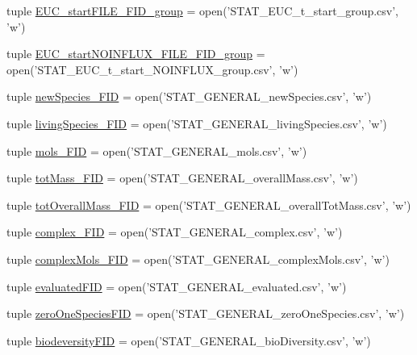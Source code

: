 \begin{DoxyCompactItemize}
\item 
tuple \hyperlink{a00099_abe1a2acadc97e46d55c6f4164c0890dc}{E\-U\-C\-\_\-start\-F\-I\-L\-E\-\_\-\-F\-I\-D\-\_\-group} = open('S\-T\-A\-T\-\_\-\-E\-U\-C\-\_\-t\-\_\-start\-\_\-group.\-csv', 'w')
\item 
tuple \hyperlink{a00099_aef08a333d5fed02e90483cc87e389ed0}{E\-U\-C\-\_\-start\-N\-O\-I\-N\-F\-L\-U\-X\-\_\-\-F\-I\-L\-E\-\_\-\-F\-I\-D\-\_\-group} = open('S\-T\-A\-T\-\_\-\-E\-U\-C\-\_\-t\-\_\-start\-\_\-\-N\-O\-I\-N\-F\-L\-U\-X\-\_\-group.\-csv', 'w')
\item 
tuple \hyperlink{a00099_abdb6e583333cc08cac8c63631db80b5b}{new\-Species\-\_\-\-F\-I\-D} = open('S\-T\-A\-T\-\_\-\-G\-E\-N\-E\-R\-A\-L\-\_\-new\-Species.\-csv', 'w')
\item 
tuple \hyperlink{a00099_ab7bbe9440116d34c9a373c40fc59bb3d}{living\-Species\-\_\-\-F\-I\-D} = open('S\-T\-A\-T\-\_\-\-G\-E\-N\-E\-R\-A\-L\-\_\-living\-Species.\-csv', 'w')
\item 
tuple \hyperlink{a00099_a603a41889d8732146d44da83ffaf0489}{mols\-\_\-\-F\-I\-D} = open('S\-T\-A\-T\-\_\-\-G\-E\-N\-E\-R\-A\-L\-\_\-mols.\-csv', 'w')
\item 
tuple \hyperlink{a00099_a1b7f5672822b59c7284cd2b703aacbc2}{tot\-Mass\-\_\-\-F\-I\-D} = open('S\-T\-A\-T\-\_\-\-G\-E\-N\-E\-R\-A\-L\-\_\-overall\-Mass.\-csv', 'w')
\item 
tuple \hyperlink{a00099_a20a06acdb6e82bcaab87d2781d3555a9}{tot\-Overall\-Mass\-\_\-\-F\-I\-D} = open('S\-T\-A\-T\-\_\-\-G\-E\-N\-E\-R\-A\-L\-\_\-overall\-Tot\-Mass.\-csv', 'w')
\item 
tuple \hyperlink{a00099_ace41560d233dff88c3073be734bae944}{complex\-\_\-\-F\-I\-D} = open('S\-T\-A\-T\-\_\-\-G\-E\-N\-E\-R\-A\-L\-\_\-complex.\-csv', 'w')
\item 
tuple \hyperlink{a00099_a2ef28958c50aabe7867b32f8dd6f4ace}{complex\-Mols\-\_\-\-F\-I\-D} = open('S\-T\-A\-T\-\_\-\-G\-E\-N\-E\-R\-A\-L\-\_\-complex\-Mols.\-csv', 'w')
\item 
tuple \hyperlink{a00099_a2cc9b964c81489c25978be53ab38eb16}{evaluated\-F\-I\-D} = open('S\-T\-A\-T\-\_\-\-G\-E\-N\-E\-R\-A\-L\-\_\-evaluated.\-csv', 'w')
\item 
tuple \hyperlink{a00099_a3dc90aca8a97c5995b013887c98d8ce9}{zero\-One\-Species\-F\-I\-D} = open('S\-T\-A\-T\-\_\-\-G\-E\-N\-E\-R\-A\-L\-\_\-zero\-One\-Species.\-csv', 'w')
\item 
tuple \hyperlink{a00099_a68c23cb79e89d9e14acf9ed09f46f0e4}{biodeversity\-F\-I\-D} = open('S\-T\-A\-T\-\_\-\-G\-E\-N\-E\-R\-A\-L\-\_\-bio\-Diversity.\-csv', 'w')

\end{DoxyCompactItemize}
